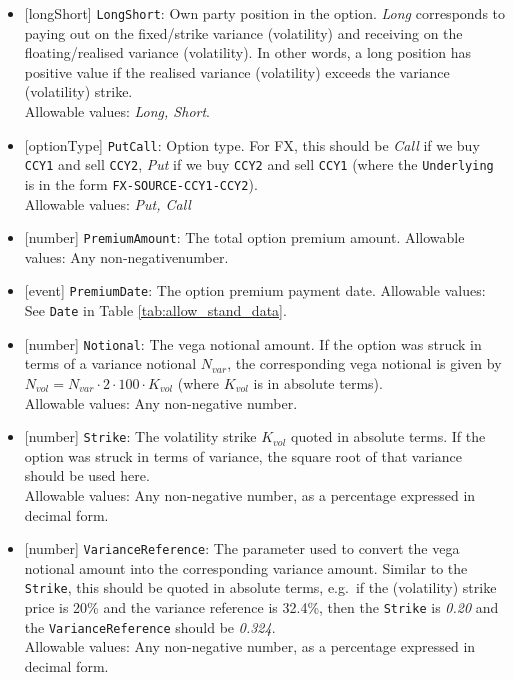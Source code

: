 \begin{itemize}
  \item{}[longShort] \lstinline!LongShort!: Own party position in the option. \emph{Long} corresponds to paying out on the
  fixed/strike variance (volatility) and receiving on the floating/realised variance (volatility). In other words,
  a long position has positive value if the realised variance (volatility) exceeds the variance (volatility)
  strike. \\
  Allowable values: \emph{Long, Short}.
  \item{}[optionType] \lstinline!PutCall!: Option type. For FX, this should be \emph{Call} if we buy
  \lstinline!CCY1! and sell \lstinline!CCY2!,
  \emph{Put} if we buy \lstinline!CCY2! and sell \lstinline!CCY1! (where the \lstinline!Underlying! is in the
  form \lstinline!FX-SOURCE-CCY1-CCY2!). \\
  Allowable values: \emph{Put, Call}
  \item{}[number] \lstinline!PremiumAmount!: The total option premium amount.
  Allowable values: Any non-negativenumber.
  \item{}[event] \lstinline!PremiumDate!: The option premium payment date.
  Allowable values: See \lstinline!Date! in Table \ref{tab:allow_stand_data}.
  \item{}[number] \lstinline!Notional!: The vega notional amount. If the option was struck in terms of a variance notional
  $N_{var}$, the corresponding vega notional is given by $N_{vol} = N_{var} \cdot 2 \cdot 100 \cdot K_{vol}$ (where
  $K_{vol}$ is in absolute terms). \\
  Allowable values: Any non-negative number.
  \item{}[number] \lstinline!Strike!: The volatility strike $K_{vol}$ quoted in absolute terms. If
  the option was struck in terms of variance, the square root of that variance should be used here. \\
  Allowable values: Any non-negative number, as a percentage expressed in decimal form.
  \item{}[number] \lstinline!VarianceReference!: The parameter used to convert the vega notional amount into the corresponding
  variance amount. Similar to the \lstinline!Strike!, this should be quoted in absolute terms, e.g.\ if the
  (volatility) strike price is 20\% and the variance reference is 32.4\%, then the \lstinline!Strike! is \emph{0.20}
  and the \lstinline!VarianceReference! should be \emph{0.324}. \\
  Allowable values: Any non-negative number, as a percentage expressed in decimal form.

\end{itemize}
